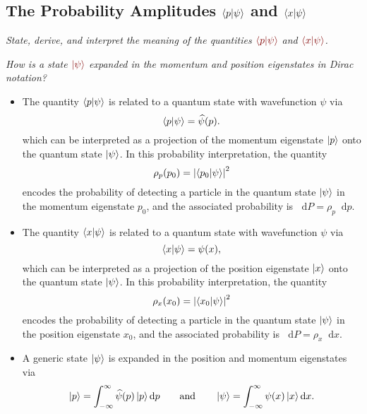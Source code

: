 \documentclass[11pt, a4paper]{article}
\newcommand{\qmath}[1]{\textcolor{Maroon}{#1}}  %
\newcommand{\diff}{\mathop{}\!\mathrm{d}} %
\newcommand{\F}[1]{\widehat{#1}} %
\begin{document}
\subsection{The Probability Amplitudes $ \braket{p}{\psi} $ and $ \braket{x}{\psi} $}

\textit{State, derive, and interpret the meaning of the quantities $ \qmath{\braket{p}{\psi}} $ and $ \qmath{\braket{x}{\psi}} $.}

\vspace{2mm}
\textit{How is a state $ \qmath{\ket{\psi}} $ expanded in the momentum and position eigenstates in Dirac notation?}

\begin{itemize}
    \item The quantity $ \braket{p}{\psi} $ is related to a quantum state with wavefunction $ \psi $ via
    \begin{equation*}
        \braket{p}{\psi} = \F{\psi}(p).
    \end{equation*}
    which can be interpreted as a projection of the momentum eigenstate $ \ket{p} $ onto the quantum state $ \ket{\psi} $. In this probability interpretation, the quantity
    \begin{equation*}
        \rho_{p}(p_{0}) = \abs{\braket{p_{0}}{\psi}}^{2}
    \end{equation*}
    encodes the probability of detecting a particle in the quantum state $ \ket{\psi} $ in the momentum eigenstate $ p_{0} $, and the associated probability is $ \diff P = \rho_{p} \diff p $.

    
    \item The quantity $ \braket{x}{\psi} $ is related to a quantum state with wavefunction $ \psi $ via
    \begin{equation*}
        \braket{x}{\psi} = \psi(x),
    \end{equation*}
    which can be interpreted as a projection of the position eigenstate $ \ket{x} $ onto the quantum state $ \ket{\psi} $. In this probability interpretation, the quantity
    \begin{equation*}
        \rho_{x}(x_{0}) = \abs{\braket{x_{0}}{\psi}}^{2}
    \end{equation*}
    encodes the probability of detecting a particle in the quantum state $ \ket{\psi} $ in the position eigenstate $ x_{0} $, and the associated probability is $ \diff P = \rho_{x} \diff x $.
    
    \item A generic state $ \ket{\psi} $ is expanded in the position and momentum eigenstates via
    \begin{equation*}
        \ket{p} = \int_{-\infty}^{\infty}\F{\psi}(p) \ket{p} \diff p \qquad \text{and} \qquad \ket{\psi} = \int_{-\infty}^{\infty}\psi(x) \ket{x}\diff x.
    \end{equation*}
    
\end{itemize}
\end{document}
